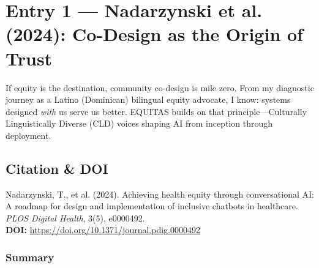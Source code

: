 \documentclass[11pt,twoside]{article}
\begin{document}
\newpage


\setcounter{page}{8}

\section*{\label{entry1}Entry 1 --- Nadarzynski et al. (2024): Co-Design as the Origin of Trust}

\vspace{-0.3cm}

If equity is the destination, community co-design is mile zero. From my diagnostic journey as a Latino (Dominican) bilingual equity advocate, I know: systems designed \emph{with} us serve us better. EQUITAS builds on that principle---Culturally Linguistically Diverse (CLD) voices shaping AI from inception through deployment.

\vspace{-0.3cm}

\subsection*{Citation \& DOI}

\vspace{-0.3cm}

Nadarzynski, T., et al. (2024). Achieving health equity through conversational AI: A roadmap for design and implementation of inclusive chatbots in healthcare. \textit{PLOS Digital Health}, 3(5), e0000492. \\

\textbf{DOI:} \href{https://doi.org/10.1371/journal.pdig.0000492}{https://doi.org/10.1371/journal.pdig.0000492}

\vspace{-0.3cm}

\subsubsection*{Summary}

\vspace{-0.3cm}
\end{document}
